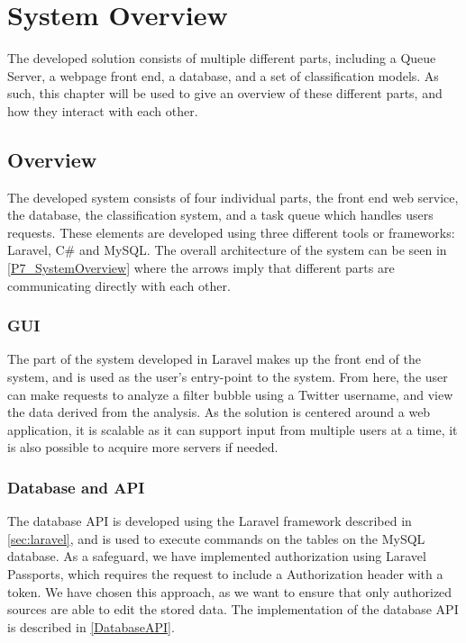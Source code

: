 \chapter{System Overview}\label{ch:sysview}
The developed solution
consists of multiple different parts, including a Queue Server, a webpage front
end, a database, and a set of classification models. As such, this chapter
will be used to give an overview of these different parts, and how they
interact with each other.

\section{Overview}
The developed system consists of four individual parts, the front end web
service, the database, the classification system, and a task queue which handles
users requests. These elements are developed using three different tools or
frameworks: Laravel, C\# and MySQL. The overall architecture of the
system can be seen in \autoref{P7_SystemOverview} where the arrows imply that
different parts are communicating directly with each other.
 

\subsection{GUI} %
The part of the system developed in Laravel makes up the front end of the
system, and is used as the user's entry-point to the system. From here, the
user can make requests to analyze a filter bubble using a Twitter username, and
view the data derived from the analysis. As the solution is centered around a web
application, it is scalable as it can support input from multiple users
at a time, it is also possible to acquire more servers if needed. 

\subsection{Database and API}
The database API is developed using the Laravel framework described in
\autoref{sec:laravel}, and is used to execute commands on the tables on the
MySQL database. As a safeguard, we have implemented authorization using Laravel
Passports, which requires the request to include a Authorization header with a
 token.
We have chosen this approach, as we want to ensure that only authorized sources are
able to edit the stored data. The implementation of the database API is
described in \autoref{DatabaseAPI}.


